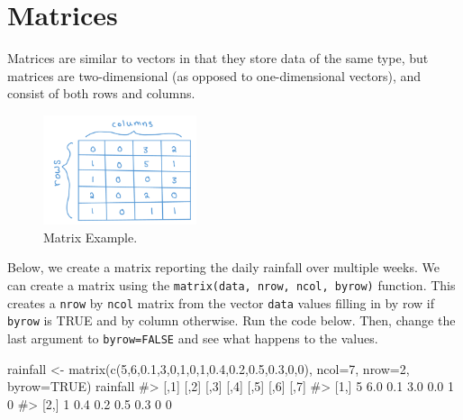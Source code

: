 \documentclass[
  letterpaper,
]{krantz}
\makeatletter
\newenvironment{Shaded}{\begin{snugshade}}{\end{snugshade}}
\newcommand{\AttributeTok}[1]{\textcolor[rgb]{0.40,0.45,0.13}{#1}}
\newcommand{\CommentTok}[1]{\textcolor[rgb]{0.37,0.37,0.37}{#1}}
\newcommand{\ConstantTok}[1]{\textcolor[rgb]{0.56,0.35,0.01}{#1}}
\newcommand{\DecValTok}[1]{\textcolor[rgb]{0.68,0.00,0.00}{#1}}
\newcommand{\FloatTok}[1]{\textcolor[rgb]{0.68,0.00,0.00}{#1}}
\newcommand{\FunctionTok}[1]{\textcolor[rgb]{0.28,0.35,0.67}{#1}}
\newcommand{\NormalTok}[1]{\textcolor[rgb]{0.00,0.23,0.31}{#1}}
\newcommand{\OtherTok}[1]{\textcolor[rgb]{0.00,0.23,0.31}{#1}}
\newenvironment{kframe}{%
\medskip{}
\setlength{\fboxsep}{.8em}
 \def\at@end@of@kframe{}%
 \ifinner\ifhmode%
  \def\at@end@of@kframe{\end{minipage}}%
  \begin{minipage}{\columnwidth}%
 \fi\fi%
 \def\FrameCommand##1{\hskip\@totalleftmargin \hskip-\fboxsep
 \colorbox{shadecolor}{##1}\hskip-\fboxsep
     \hskip-\linewidth \hskip-\@totalleftmargin \hskip\columnwidth}%
 \MakeFramed {\advance\hsize-\width
   \@totalleftmargin\z@ \linewidth\hsize
   \@setminipage}}%
 {\par\unskip\endMakeFramed%
 \at@end@of@kframe}
\renewenvironment{Shaded}{\begin{kframe}}{\end{kframe}}
\makeatother
\begin{document}
\hypertarget{matrices}{%
\section{Matrices}\label{matrices}}

Matrices are similar to vectors in that they store data of the same
type, but matrices are two-dimensional (as opposed to one-dimensional
vectors), and consist of both rows and columns.

\begin{figure}

{\centering \includegraphics[width=0.4\textwidth,height=\textheight]{book/images/2-matrix.png}

}

\caption{\label{fig-matrix}Matrix Example.}

\end{figure}

Below, we create a matrix reporting the daily rainfall over multiple
weeks. We can create a matrix using the
\texttt{matrix(data,\ nrow,\ ncol,\ byrow)} function. This creates a
\texttt{nrow} by \texttt{ncol} matrix from the vector \texttt{data}
values filling in by row if \texttt{byrow} is TRUE and by column
otherwise. Run the code below. Then, change the last argument to
\texttt{byrow=FALSE} and see what happens to the values.

\begin{Shaded}
\begin{Highlighting}[]
\NormalTok{rainfall }\OtherTok{\textless{}{-}} \FunctionTok{matrix}\NormalTok{(}\FunctionTok{c}\NormalTok{(}\DecValTok{5}\NormalTok{,}\DecValTok{6}\NormalTok{,}\FloatTok{0.1}\NormalTok{,}\DecValTok{3}\NormalTok{,}\DecValTok{0}\NormalTok{,}\DecValTok{1}\NormalTok{,}\DecValTok{0}\NormalTok{,}\DecValTok{1}\NormalTok{,}\FloatTok{0.4}\NormalTok{,}\FloatTok{0.2}\NormalTok{,}\FloatTok{0.5}\NormalTok{,}\FloatTok{0.3}\NormalTok{,}\DecValTok{0}\NormalTok{,}\DecValTok{0}\NormalTok{), }
                   \AttributeTok{ncol=}\DecValTok{7}\NormalTok{, }\AttributeTok{nrow=}\DecValTok{2}\NormalTok{, }\AttributeTok{byrow=}\ConstantTok{TRUE}\NormalTok{)}
\NormalTok{rainfall}
\CommentTok{\#\textgreater{}      [,1] [,2] [,3] [,4] [,5] [,6] [,7]}
\CommentTok{\#\textgreater{} [1,]    5  6.0  0.1  3.0  0.0    1    0}
\CommentTok{\#\textgreater{} [2,]    1  0.4  0.2  0.5  0.3    0    0}
\end{Highlighting}
\end{Shaded}
\end{document}
